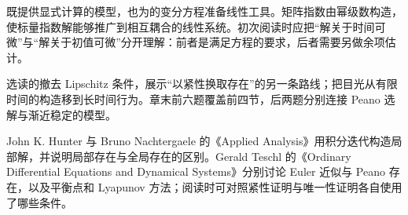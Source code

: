 \ProseParagraphBreak

既提供显式计算的模型，也为的变分方程准备线性工具。矩阵指数由幂级数构造，使标量指数解能够推广到相互耦合的线性系统。初次阅读时应把“解关于时间可微”与“解关于初值可微”分开理解：前者是满足方程的要求，后者需要另做余项估计。

\ProseParagraphBreak

选读的撤去 Lipschitz 条件，展示“以紧性换取存在”的另一条路线；把目光从有限时间的构造移到长时间行为。章末前六题覆盖前四节，后两题分别连接 Peano 选解与渐近稳定的模型。

\ProseParagraphBreak

John K. Hunter 与 Bruno Nachtergaele 的《Applied Analysis》\cite[Section 3.5]{Hunter2001Applied}用积分迭代构造局部解，并说明局部存在与全局存在的区别。Gerald Teschl 的《Ordinary Differential Equations and Dynamical Systems》\cite[Section 2.7; Sections 6.5--6.6]{Teschl2012ODE}分别讨论 Euler 近似与 Peano 存在，以及平衡点和 Lyapunov 方法；阅读时可对照紧性证明与唯一性证明各自使用了哪些条件。








